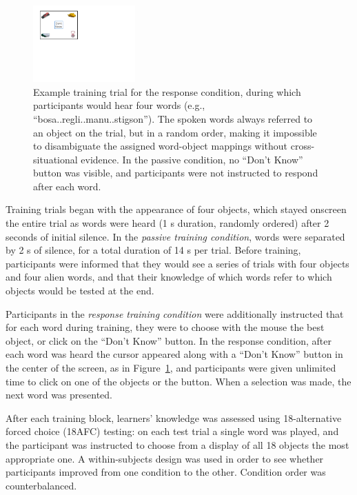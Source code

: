 \documentclass[man,floatsintext]{apa6}
\begin{document}
\begin{figure}[h]
  \centering
  \includegraphics[width=0.35\textwidth]{task_diagram}
  \caption{Example training trial for the response condition, during which participants would hear four words (e.g., ``bosa..regli..manu..stigson''). The spoken words always referred to an object on the trial, but in a random order, making it impossible to disambiguate the assigned word-object mappings without cross-situational evidence. In the passive condition, no ``Don't Know'' button was visible, and participants were not instructed to respond after each word.}
  \label{fig:trial}
\end{figure} 

Training trials began with the appearance of four objects, which stayed onscreen the entire trial as words were heard (1 s duration, randomly ordered) after 2 seconds of initial silence. In the {\em passive training condition}, words were separated by 2 s of silence, for a total duration of 14 s per trial. Before training, participants were informed that they would see a series of trials with four objects and four alien words, and that their knowledge of which words refer to which objects would be tested at the end. 

Participants in the {\em response training condition} were additionally instructed that for each word during training, they were to choose with the mouse the best object, or click on the ``Don't Know'' button. In the response condition, after each word was heard the cursor appeared along with a ``Don't Know'' button in the center of the screen, as in Figure~\ref{fig:trial}, and participants were given unlimited time to click on one of the objects or the button. When a selection was made, the next word was presented.

After each training block, learners' knowledge was assessed using 18-alternative forced choice (18AFC) testing: on each test trial a single word was played, and the participant was instructed to choose from a display of all 18 objects the most appropriate one. A within-subjects design was used in order to see whether participants improved from one condition to the other. Condition order was counterbalanced.
\end{document}
